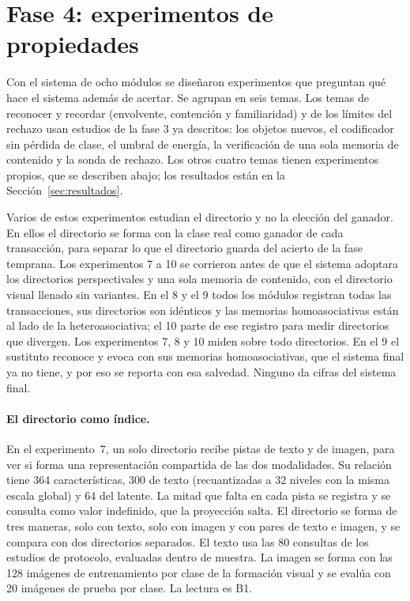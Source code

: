 \section{Fase 4: experimentos de propiedades}
\label{fase4:propiedades}

Con el sistema de ocho módulos se diseñaron experimentos que preguntan qué hace el
sistema además de acertar.
Se agrupan en seis temas.
Los temas de reconocer y recordar (envolvente, contención y familiaridad) y de los
límites del rechazo usan estudios de la fase 3 ya descritos: los objetos nuevos, el
codificador sin pérdida de clase, el umbral de energía, la verificación de una sola
memoria de contenido y la sonda de rechazo.
Los otros cuatro temas tienen experimentos propios, que se describen abajo; los
resultados están en la Sección~\ref{sec:resultados}.

Varios de estos experimentos estudian el directorio y no la elección del ganador.
En ellos el directorio se forma con la clase real como ganador de cada transacción, para
separar lo que el directorio guarda del acierto de la fase temprana.
Los experimentos 7 a 10 se corrieron antes de que el sistema adoptara los directorios
perspectivales y una sola memoria de contenido, con el directorio visual llenado sin
variantes.
En el 8 y el 9 todos los módulos registran todas las transacciones, sus directorios son
idénticos y las memorias homoasociativas están al lado de la heteroasociativa; el 10
parte de ese registro para medir directorios que divergen.
Los experimentos 7, 8 y 10 miden sobre todo directorios.
En el 9 el sustituto reconoce y evoca con sus memorias homoasociativas, que el sistema
final ya no tiene, y por eso se reporta con esa salvedad.
Ninguno da cifras del sistema final.

\paragraph{El directorio como índice.}
En el experimento~7, un solo directorio recibe pistas de texto y de imagen, para ver si
forma una representación compartida de las dos modalidades.
Su relación tiene 364 características, 300 de texto (recuantizadas a 32 niveles con la
misma escala global) y 64 del latente.
La mitad que falta en cada pista se registra y se consulta como valor indefinido, que la
proyección salta.
El directorio se forma de tres maneras, solo con texto, solo con imagen y con pares de
texto e imagen, y se compara con dos directorios separados.
El texto usa las 80 consultas de los estudios de protocolo, evaluadas dentro de muestra.
La imagen se forma con las 128 imágenes de entrenamiento por clase de la formación
visual y se evalúa con 20 imágenes de prueba por clase.
La lectura es B1.

